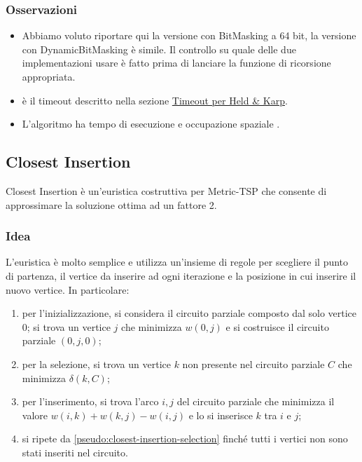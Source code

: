 \subsubsection{Osservazioni}

\begin{itemize}
    \item Abbiamo voluto riportare qui la versione con BitMasking a 64 bit, la versione con DynamicBitMasking è simile. Il controllo su quale delle due implementazioni usare è fatto prima di lanciare la funzione di ricorsione appropriata.\\
    \item {} è il timeout descritto nella sezione \hyperref[sub:timeout]{Timeout per Held \& Karp}. \\
    \item L'algoritmo ha tempo di esecuzione \complexityHeldKarpTime{} e occupazione spaziale \complexityHeldKarpSpace{}.
\end{itemize}


\subsection{Closest Insertion}
\label{sec:closest-insertion}

Closest Insertion è un'euristica costruttiva per Metric-TSP che
consente di approssimare la soluzione ottima ad un fattore
2.

\subsubsection{Idea}

L'euristica è molto semplice e utilizza un'insieme di regole per
scegliere il punto di partenza, il vertice da inserire ad ogni
iterazione e la posizione in cui inserire il nuovo vertice. In
particolare:

\begin{enumerate}
    \item per l'inizializzazione, si considera il circuito parziale composto
      dal solo vertice $0$; si trova un vertice $j$ che minimizza $w(0,
      j)$ e si costruisce il circuito parziale $(0, j,0)$;
    \item per la selezione, si trova un vertice $k$ non presente nel circuito
      parziale $C$ che minimizza $\delta(k,C)$;
    \label{pseudo:closest-insertion-selection}
    \item per l'inserimento, si trova l’arco ${i, j}$ del circuito parziale che
      minimizza il valore $w(i, k) + w(k, j) - w(i, j)$ e lo si inserisce
      $k$ tra $i$ e $j$;
    \item si ripete da \ref{pseudo:closest-insertion-selection} finché
tutti i vertici non sono stati inseriti nel circuito.
\end{enumerate}

